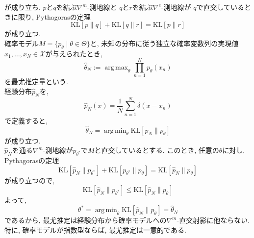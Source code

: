 \documentclass{jarticle}
\theoremstyle{definition}
\DeclareMathOperator*{\argmin}{arg\,min}
\DeclareMathOperator*{\argmax}{arg\,max}
\begin{document}
   が成り立ち, 
   $p$と$q$を結ぶ$\nabla^m$-測地線と
   $q$と$r$を結ぶ$\nabla^e$-測地線が
   $q$で直交しているときに限り, Pythagorasの定理
   \[
   		\text{KL}[p\|q]+\text{KL}[q\|r]=\text{KL}[p\|r]
   \]
   が成り立つ.\\
   確率モデル$M=\{p_\theta\mid\theta\in\Theta\}$と, 
   未知の分布に従う独立な確率変数列の実現値$x_1,\dots,x_N\in\mathcal{X}$が与えられたとき, 
   \[
   		\hat{\theta}_N:=\argmax_{\theta}\prod_{n=1}^N p_\theta(x_n)
   \]
   を最尤推定量という.\\
   経験分布$\hat{p}_N$を,
   \[
   		\hat{p}_N(x)=\frac{1}{N}\sum_{n=1}^N\delta(x-x_n)
   \]
   で定義すると, 
   \[
   		\hat{\theta}_N=\argmin_{\theta}\text{KL}[\hat{p}_N\|p_\theta]
   \]
   が成り立つ.\\
   $\hat{p}_N$を通る$\nabla^m$-測地線が$p_{\theta^*}$で$M$と直交しているとする. 
   このとき, 任意の$\theta$に対し, Pythagorasの定理
   \[
   		\text{KL}[\hat{p}_N\|p_{\theta^*}]+\text{KL}[p_{\theta^*}\|p_\theta]
        =\text{KL}[\hat{p}_N\|p_{\theta}]
   \]
   が成り立つので, 
   \[
   		\text{KL}[\hat{p}_N\|p_{\theta^*}]
        \leq \text{KL}[\hat{p}_N\|p_{\theta}]
   \]
   よって, 
   \[
   		\theta^*=\argmin_{\theta} \text{KL}[\hat{p}_N\|p_{\theta}]=\hat{\theta}_N
   \]
   であるから, 最尤推定は経験分布から確率モデルへの$\nabla^m$-直交射影に他ならない. 
   特に, 確率モデルが指数型ならば, 最尤推定は一意的である.
   
\end{document}
